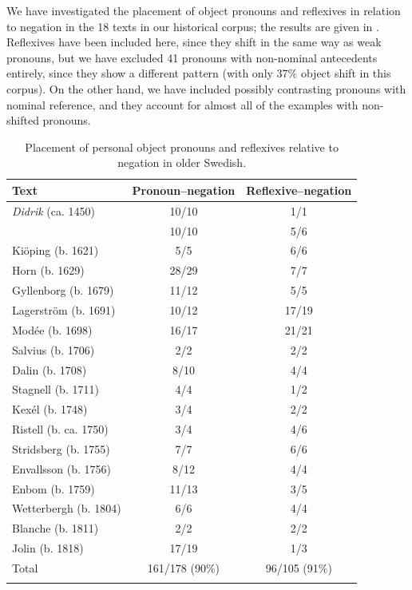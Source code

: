 \documentclass[output=paper]{langscibook}
\begin{document}
\z
\z


We have investigated the placement of object pronouns and reflexives in relation to negation in the 18 texts in our historical corpus; the results are given in . Reflexives have been included here, since they shift in the same way as weak pronouns, but we have excluded 41 pronouns with non-nominal antecedents entirely, since they show a different pattern (with only 37\% object shift in this corpus). On the other hand, we have included possibly contrasting pronouns with nominal reference, and they account for almost all of the examples with non-shifted pronouns.


\begin{table}
\caption{Placement of personal object pronouns and reflexives relative to negation in older Swedish.}
\label{tab:lalu:4}
\begin{tabular}{lcc}
\lsptoprule
Text & Pronoun–negation & Reflexive--negation\\
\midrule
\textit{Didrik} (ca. 1450) & 10/10 & 1/1\\
\citet{Swart1560} & 10/10 & 5/6\\
Kiöping (b. 1621) & 5/5 & 6/6\\
Horn (b. 1629) & 28/29 & 7/7\\
Gyllenborg (b. 1679) & 11/12 & 5/5\\
Lagerström (b. 1691) & 10/12 & 17/19\\
Modée (b. 1698) & 16/17 & 21/21\\
Salvius (b. 1706) & 2/2 & 2/2\\
Dalin (b. 1708) & 8/10 & 4/4\\
Stagnell (b. 1711) & 4/4 & 1/2\\
Kexél (b. 1748) & 3/4 & 2/2\\
Ristell (b. ca. 1750) & 3/4 & 4/6\\
Stridsberg (b. 1755) & 7/7 & 6/6\\
Envallsson (b. 1756) & 8/12 & 4/4\\
Enbom (b. 1759) & 11/13 & 3/5\\
Wetterbergh (b. 1804) & 6/6 & 4/4\\
Blanche (b. 1811) & 2/2 & 2/2\\
Jolin (b. 1818) & 17/19 & 1/3\\
\midrule
Total & 161/178 (90\%) & 96/105 (91\%)\\
\lspbottomrule
\end{tabular}
\end{table}
\end{document}
